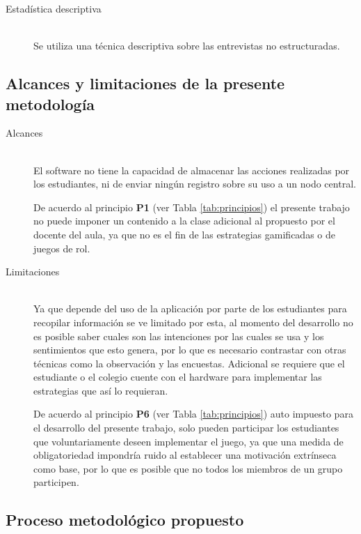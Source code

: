 \begin{description}
\item[Estadística descriptiva] \hfill \\ Se utiliza una técnica descriptiva sobre las entrevistas no 
estructuradas.
\end{description}

\subsection{Alcances y limitaciones de la presente metodología}

\begin{description}
\item[Alcances] \hfill \\ El software no tiene la capacidad de almacenar las acciones realizadas por los 
estudiantes, ni de enviar ningún registro sobre su uso a un nodo central.

De acuerdo al principio \textbf{P1} (ver Tabla \ref{tab:principios}) el presente trabajo no puede imponer un
contenido a la clase adicional al propuesto por el docente del aula, ya que no es el fin de las estrategias
gamificadas o de juegos de rol.

\item[Limitaciones] \hfill \\ Ya que depende del uso de la aplicación por parte de los estudiantes para 
recopilar información se ve limitado por esta, al momento del desarrollo no es posible saber cuales son las 
intenciones por las cuales se usa y los sentimientos que esto genera, por lo que es necesario contrastar con 
otras técnicas como la observación y las encuestas. Adicional se requiere que el estudiante o el colegio 
cuente con el hardware para implementar las estrategias que así lo requieran.

De acuerdo al principio \textbf{P6} (ver Tabla \ref{tab:principios}) auto impuesto para el desarrollo del
presente trabajo, solo pueden participar los estudiantes que voluntariamente deseen implementar el juego, ya
que una medida de obligatoriedad impondría ruido al establecer una motivación extrínseca como base, por lo que
es posible que no todos los miembros de un grupo participen.
\end{description}

\subsection{Proceso metodológico propuesto}

